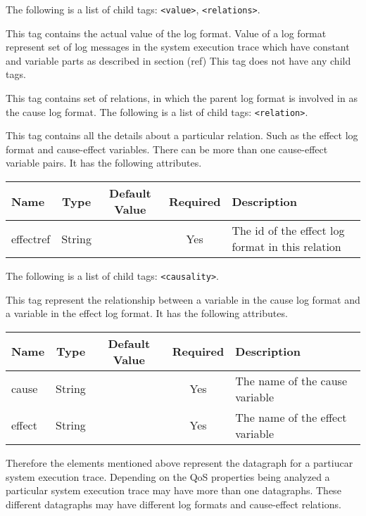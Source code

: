 \noindent The following is a list of child tags:
\texttt{<value>}, \texttt{<relations>}.

This tag contains the actual value of the log format. Value of a log 
format represent set of log messages in the system execution trace 
which have constant and variable parts as described in section (ref) 
This tag does not have any child tags.


This tag contains set of relations, in which the parent log format is 
involved in as the cause log format.
The following is a list of child tags: \texttt{<relation>}.


This tag contains all the details about a particular relation. Such 
as the effect log format and cause-effect variables. There can be 
more than one cause-effect variable pairs. It has the following 
attributes.
\begin{table}[h]
  \begin{tabular}{lcccl}
  \hline
  \textbf{Name} & \textbf{Type} & \textbf{Default Value} & \textbf{Required} & \textbf{Description} \\
  \hline
  effectref & String  & & Yes & The id of the effect log format in this relation \\
  \end{tabular}
\end{table}

\noindent The following is a list of child tags:
\texttt{<causality>}.


This tag represent the relationship between a variable in the 
cause log format and a variable in the effect log format. It has 
the following attributes.
\begin{table}[h]
  \begin{tabular}{lcccl}
  \hline
  \textbf{Name} & \textbf{Type} & \textbf{Default Value} & \textbf{Required} & \textbf{Description} \\
  \hline
  cause & String  & & Yes & The name of the cause variable \\
  effect  & String  & & Yes &  The name of the effect variable \\   
  \end{tabular}
\end{table}

Therefore the elements mentioned above represent the datagraph 
for a partiucar system execution trace. Depending on the QoS 
properties being analyzed a particular system execution trace 
may have more than one datagraphs. These different datagraphs 
may have different log formats and cause-effect relations.

